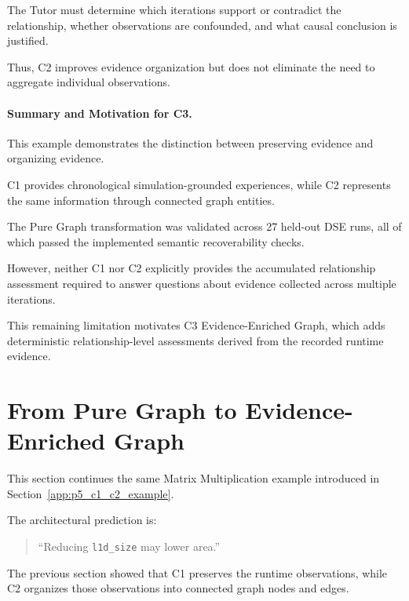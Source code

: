The Tutor must determine
which iterations support
or contradict the relationship,
whether observations are
confounded, and what causal
conclusion is justified.

Thus, C2 improves evidence
organization but does not
eliminate the need to aggregate
individual observations.

\paragraph{Summary and Motivation for C3.}

This example demonstrates
the distinction between
preserving evidence and
organizing evidence.

C1 provides chronological
simulation-grounded experiences,
while C2 represents the same
information through connected
graph entities.

The Pure Graph transformation
was validated across 27 held-out
DSE runs, all of which passed
the implemented semantic
recoverability checks.

However, neither C1 nor C2
explicitly provides the
accumulated relationship
assessment required to answer
questions about evidence
collected across multiple
iterations.

This remaining limitation
motivates C3 Evidence-Enriched
Graph, which adds deterministic
relationship-level assessments
derived from the recorded
runtime evidence.





\section{From Pure Graph to Evidence-Enriched Graph}
\label{app:p5_c2_c3_comparison}
\label{app:p5_c3_example}

This section continues the same
Matrix Multiplication example
introduced in
Section~\ref{app:p5_c1_c2_example}.

The architectural prediction is:

\begin{quote}
``Reducing \texttt{l1d\_size}
may lower area.''
\end{quote}

The previous section showed that
C1 preserves the runtime observations,
while C2 organizes those observations
into connected graph nodes and edges.

